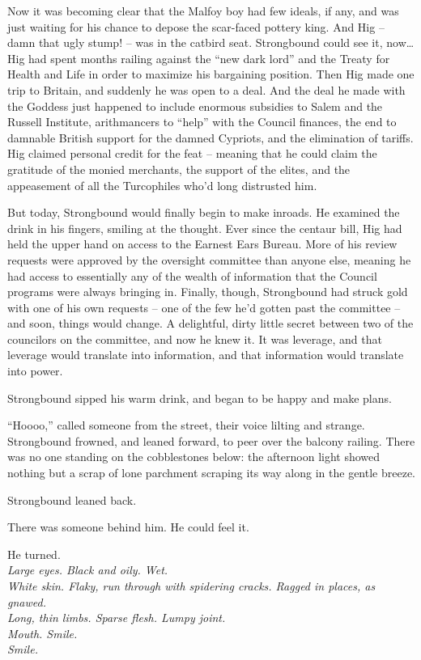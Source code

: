 Now it was becoming clear that the Malfoy boy had few ideals, if any,
and was just waiting for his chance to depose the scar-faced pottery
king. And Hig -- damn that ugly stump! -- was in the catbird seat.
Strongbound could see it, now\ldots{} Hig had spent months railing
against the ``new dark lord'' and the Treaty for Health and Life in
order to maximize his bargaining position. Then Hig made one trip to
Britain, and suddenly he was open to a deal. And the deal he made with
the Goddess just happened to include enormous subsidies to Salem and the
Russell Institute, arithmancers to ``help'' with the Council finances,
the end to damnable British support for the damned Cypriots, and the
elimination of tariffs. Hig claimed personal credit for the feat --
meaning that he could claim the gratitude of the monied merchants, the
support of the elites, and the appeasement of all the Turcophiles who'd
long distrusted him.

But today, Strongbound would finally begin to make inroads. He examined
the drink in his fingers, smiling at the thought. Ever since the centaur
bill, Hig had held the upper hand on access to the Earnest Ears Bureau.
More of his review requests were approved by the oversight committee
than anyone else, meaning he had access to essentially any of the wealth
of information that the Council programs were always bringing in.
Finally, though, Strongbound had struck gold with one of his own
requests -- one of the few he'd gotten past the committee -- and soon,
things would change. A delightful, dirty little secret between two of
the councilors on the committee, and now he knew it. It was leverage,
and that leverage would translate into information, and that information
would translate into power.

Strongbound sipped his warm drink, and began to be happy and make plans.

``Hoooo,'' called someone from the street, their voice lilting and
strange. Strongbound frowned, and leaned forward, to peer over the
balcony railing. There was no one standing on the cobblestones below:
the afternoon light showed nothing but a scrap of lone parchment
scraping its way along in the gentle breeze.

Strongbound leaned back.

There was someone behind him. He could feel it.

He turned.\\

\emph{Large eyes. Black and oily. Wet.}\\
\emph{White skin. Flaky, run through with spidering cracks. Ragged in
places, as gnawed.}\\
\emph{Long, thin limbs. Sparse flesh. Lumpy joint.}\\
\emph{Mouth. Smile.}\\
\emph{Smile.}\\

